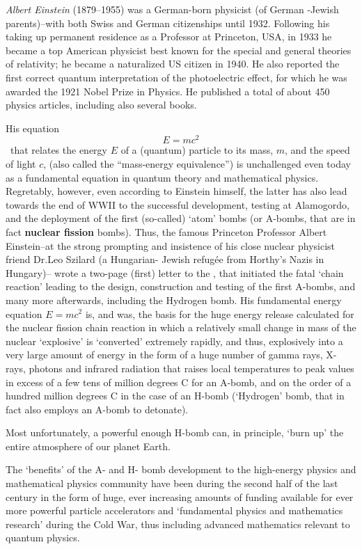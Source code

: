 \documentclass[12pt]{article}
\begin{document}
\emph{Albert Einstein} (1879--1955) was a German-born physicist (of German -Jewish parents)--with both Swiss and German citizenships until 1932.  Following his taking up permanent residence as a Professor at Princeton, USA, in 1933 he became a top American physicist best known for the special and general theories of relativity; he became a naturalized US citizen in 1940. He also reported the first correct quantum interpretation of the photoelectric effect, for which he was awarded the 1921 Nobel Prize in Physics. He published a total of about 450 physics articles, including also several books. 

His equation \, $$E = mc^2$$\ that relates the energy $E$ of a (quantum) particle to its mass, $m$, and the speed of light $c$, (also called the ``mass-energy equivalence'') is unchallenged even today as a fundamental equation in quantum theory and mathematical physics. Regretably, however, even according to Einstein himself, the latter has also lead towards the end of WWII to the successful development, testing at Alamogordo, and the deployment of the first (so-called) `atom' bombs (or A-bombs, that are in fact \textbf{nuclear fission} bombs). Thus, the famous Princeton Professor Albert Einstein--at the strong prompting and insistence of his close nuclear physicist friend Dr.Leo Szilard (a Hungarian- Jewish refug\'ee from Horthy's Nazis in Hungary)-- wrote a two-page (first) letter to the 
, that initiated the  fatal `chain reaction' leading to the design, construction and testing of the first A-bombs, and many more afterwards, including the Hydrogen bomb. His fundamental energy equation $E = mc^2$ is, and was, the basis for the huge energy release calculated for the nuclear fission chain reaction in which a relatively small change in mass of the nuclear `explosive' is `converted' extremely rapidly, and thus, explosively into a very large amount of energy in the form of a huge number of gamma rays, X-rays, photons and infrared radiation that raises local temperatures to peak values in excess of a few tens of million degrees C for an A-bomb, and on the order of a hundred million degrees C in the case of an H-bomb (`Hydrogen' bomb, that in fact also employs an A-bomb to detonate). 

 Most unfortunately, a powerful enough H-bomb can, in principle,  `burn up' the entire atmosphere of our planet Earth.
 
 The `benefits' of the A- and H- bomb development to the high-energy physics and mathematical physics community have been during the second half of the last century in the form of huge, ever increasing amounts of funding available for ever more powerful particle accelerators and `fundamental physics and mathematics research' during the Cold War, thus including advanced mathematics relevant to quantum physics.   
\end{document}
